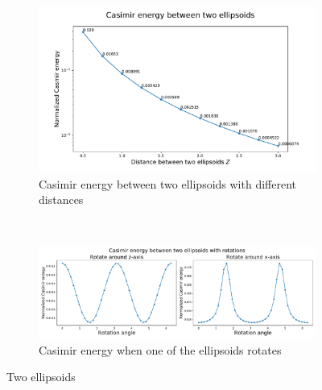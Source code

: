     \begin{figure}[H]
        \begin{subfigure}{\linewidth}
            \centering
            \includegraphics[scale = 0.5]{figures/CasE_ellipsoids.pdf}
            \caption{Casimir energy between two ellipsoids with different distances}
            \label{Casimir energy between two ellipsoids with different distances}
            \end{subfigure}\\[1ex]
    
        \begin{subfigure}{\linewidth}
        \centering
        \hspace*{-1cm}\includegraphics[scale = 0.5]{figures/CasE_ellipsoids_with_rotation.pdf}
        \caption{Casimir energy when one of the ellipsoids rotates}
        \label{Casimir energy when one of the ellipsoids rotates}
        \end{subfigure}
        \caption{Two ellipsoids}
        \end{figure}

